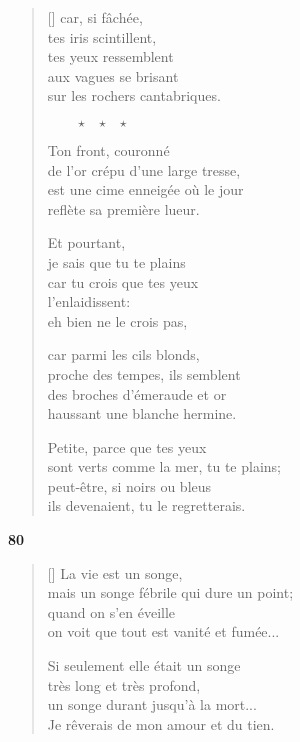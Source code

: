 \documentclass[a4paper,12pt]{book}
\begin{document}
\begin{verse}[\versewidth]
  car, si fâchée, \\
  tes iris scintillent, \\
  tes yeux ressemblent \\
  aux vagues se brisant \\
  sur les rochers cantabriques.

  $\ \ \ \ \ \ \ \ \ \star \ \ \ \star \ \ \ \star$

  Ton front, couronné \\
  de l'or crépu d'une large tresse, \\
  est une cime enneigée où le jour \\
  reflète sa première lueur.

  Et pourtant, \\
  je sais que tu te plains \\
  car tu crois que tes yeux \\
  l'enlaidissent: \\
  eh bien ne le crois pas,

  car parmi les cils blonds, \\
  proche des tempes, ils semblent \\
  des broches d'émeraude et or \\
  haussant une blanche hermine.

  Petite, parce que tes yeux \\
  sont verts comme la mer, tu te plains; \\
  peut-être, si noirs ou bleus \\
  ils devenaient, tu le regretterais.
\end{verse}

\bigskip

\begin{center}
  \textbf{80}
\end{center}

\settowidth{\versewidth}{un songe qui durerait jusqu'à la mort...!}

\begin{verse}[\versewidth]
  La vie est un songe, \\
  mais un songe fébrile qui dure un point; \\
  quand on s'en éveille \\
  on voit que tout est vanité et fumée...

  Si seulement elle était un songe \\
  très long et très profond, \\
  un songe durant jusqu'à la mort... \\
  Je rêverais de mon amour et du tien.
\end{verse}
\end{document}
